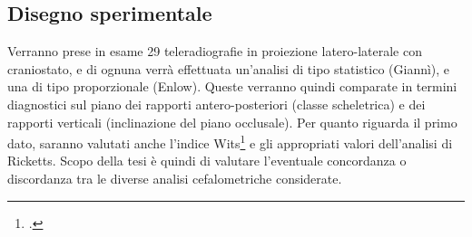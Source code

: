 \subsection{Disegno sperimentale}
Verranno prese in esame 29 teleradiografie in proiezione latero-laterale con craniostato, e di ognuna verrà effettuata un'analisi di tipo statistico (Giannì), e una di tipo proporzionale (Enlow). Queste verranno quindi comparate in termini diagnostici sul piano dei rapporti antero-posteriori (classe scheletrica) e dei rapporti verticali (inclinazione del piano occlusale). Per quanto riguarda il primo dato, saranno valutati anche l'indice Wits\footcite{Jacobson1975} e gli appropriati valori dell'analisi di Ricketts. Scopo della tesi è quindi di valutare l'eventuale concordanza o discordanza tra le diverse analisi cefalometriche considerate.
